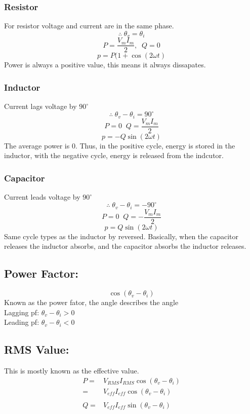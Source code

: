 \documentclass[a5paper]{article}
\begin{document}
	\subsubsection{Resistor}
	For resistor voltage and current are in the same phase.
	$$\therefore\;\theta_{v}=\theta_{i}$$
	$$P=\frac{V_{m}I_{m}}{2},\;\;Q=0$$
	$$p=P(1+\cos{(2\omega t)}$$
	Power is always a positive value, this means it always dissapates.
	\subsubsection{Inductor}
	Current lags voltage by $90^{\circ}$
	$$\therefore\;\theta_{v}-\theta_{i}=90^{\circ}$$
	$$P=0\;\;Q=\frac{V_{m}I_{m}}{2}$$
	$$p=-Q\sin{(2\omega t)}$$
	The average power is 0. Thus, in the positive cycle, energy is stored in the inductor, with the negative cycle, energy is released from the indcutor.
	\subsubsection{Capacitor}
	Current leads voltage by $90^{\circ}$
	$$\therefore\;\theta_{v}-\theta_{i}=-90^{\circ}$$
	$$P=0\;\;Q=-\frac{V_{m}I_{m}}{2}$$
	$$p=Q\sin{(2\omega t)}$$
	Same cycle types as the inductor by reversed. Basically, when the capacitor releases the inductor absorbs, and the capacitor absorbs the inductor releases.
	\subsection{Power Factor:}
	$$\cos{(\theta_{v}-\theta_{i})}$$
	Known as the power fator, the angle describes the angle\\
	Lagging pf: $\theta_{v}-\theta_{i}>0$\\
	Leading pf: $\theta_{v}-\theta_{i}<0$
	\subsection{RMS Value:}
	This is mostly known as the effective value.
	\begin{align*}
		P=&V_{RMS}I_{RMS}\cos{(\theta_{v}-\theta_{i})}\\
		=&V_{eff}I_{eff}\cos{(\theta_{v}-\theta_{i})}\\\\
		Q=&V_{eff}I_{eff}\sin{(\theta_{v}-\theta_{i})}
	\end{align*}
\end{document}
